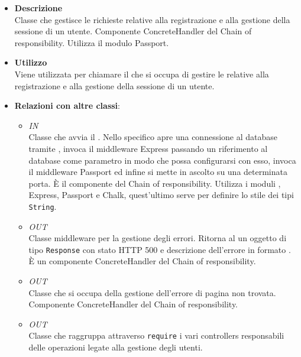 \begin{itemize}
\item \textbf{Descrizione}\\
Classe che gestisce le richieste relative alla registrazione e alla gestione della sessione di un utente. Componente ConcreteHandler del  Chain of responsibility. Utilizza il modulo Passport.
\item \textbf{Utilizzo}\\
Viene utilizzata per chiamare il  che si occupa di gestire le  relative alla registrazione e alla gestione della sessione di un utente.
\item \textbf{Relazioni con altre classi}:
\begin{itemize}
\item \textit{IN} \hyperref[\nogloxy{Premi::Back-End::Server}]{}\\
Classe che avvia il . Nello specifico apre una connessione al database tramite , invoca il middleware Express passando un riferimento al database  come parametro in modo che possa configurarsi con esso, invoca il middleware Passport ed infine si mette in ascolto su una determinata porta. \`E il componente  del  Chain of responsibility. Utilizza i moduli , Express, Passport e Chalk, quest’ultimo serve per definire lo stile dei tipi \texttt{String}.
\item \textit{OUT} \hyperref[\nogloxy{Premi::Back-End::App::Controllers::ErrorHandler}]{}\\
Classe middleware per la gestione degli errori. Ritorna al  un oggetto di tipo \texttt{Response} con stato HTTP 500 e descrizione dell'errore in formato . \`E un componente ConcreteHandler del  Chain of responsibility.
\item \textit{OUT} \hyperref[\nogloxy{Premi::Back-End::App::Controllers::NotFoundHandler}]{}\\
Classe che si occupa della gestione dell'errore di pagina non trovata. Componente
ConcreteHandler del  Chain of responsibility.
\item \textit{OUT} \hyperref[\nogloxy{Premi::Back-End::App::Controllers::UserController}]{}\\
Classe che raggruppa attraverso \texttt{require} i vari controllers responsabili delle operazioni legate alla gestione degli utenti.

\end{itemize}
\end{itemize}
